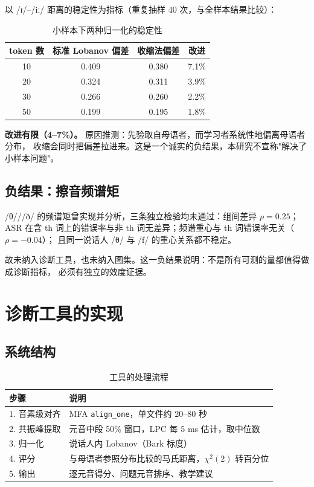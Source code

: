 \documentclass[11pt,a4paper]{ctexart}
\newcommand{\ipa}[1]{/#1/}
\begin{document}
以 \ipa{ɪ}–\ipa{iː} 距离的稳定性为指标（重复抽样 40 次，与全样本结果比较）：

\begin{table}[htbp]
\centering
\caption{小样本下两种归一化的稳定性}
\label{tab:shrink}
\begin{tabular}{cccc}
\toprule
token 数 & 标准 Lobanov 偏差 & 收缩法偏差 & 改进 \\
\midrule
10 & 0.409 & 0.380 & 7.1\% \\
20 & 0.324 & 0.311 & 3.9\% \\
30 & 0.266 & 0.260 & 2.2\% \\
50 & 0.199 & 0.195 & 1.8\% \\
\bottomrule
\end{tabular}
\end{table}

\textbf{改进有限（4--7\%）。} 原因推测：先验取自母语者，而学习者系统性地偏离母语者分布，
收缩会同时把偏差拉进来。这是一个诚实的负结果，本研究不宣称"解决了小样本问题"。

\subsection{负结果：擦音频谱矩}

\ipa{θ}/\ipa{ð} 的频谱矩曾实现并分析，三条独立检验均未通过：组间差异 $p=0.25$；
ASR 在含 th 词上的错误率与非 th 词无差异；频谱重心与 th 词错误率无关（$\rho=-0.04$）；
且同一说话人 \ipa{θ} 与 \ipa{f} 的重心关系都不稳定。

故未纳入诊断工具，也未纳入图集。这一负结果说明：不是所有可测的量都值得做成诊断指标，
必须有独立的效度证据。

\section{诊断工具的实现}

\subsection{系统结构}

\begin{table}[htbp]
\centering
\caption{工具的处理流程}
\label{tab:pipeline}
\begin{tabular}{ll}
\toprule
步骤 & 说明 \\
\midrule
1. 音素级对齐 & MFA \texttt{align\_one}，单文件约 20--80 秒 \\
2. 共振峰提取 & 元音中段 50\% 窗口，LPC 每 5 ms 估计，取中位数 \\
3. 归一化 & 说话人内 Lobanov（Bark 标度） \\
4. 评分 & 与母语者参照分布比较的马氏距离，$\chi^2(2)$ 转百分位 \\
5. 输出 & 逐元音得分、问题元音排序、教学建议 \\
\bottomrule
\end{tabular}
\end{table}
\end{document}
